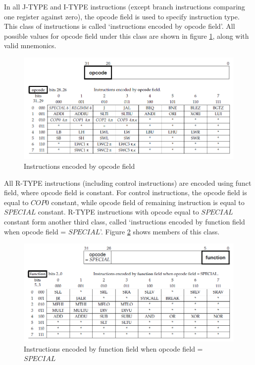 \documentclass[]{scrartcl}
\begin{document}
In all J-TYPE and I-TYPE instructions
(except branch instructions comparing one register against zero),
the opcode field is used to specify instruction type. This class
of instructions is called `instructions encoded by opcode field'.
All possible values for opcode field under this class are shown
in figure \ref{encoding1}, along with valid mnemonics.\\

\begin{figure}[H]
\begin{center}
\includegraphics[width=\textwidth]{encoding1.png}
\end{center}
\caption{Instructions encoded by opcode field}
\label{encoding1}
\end{figure}

All R-TYPE instructions (including control instructions)
are encoded using funct field, where opcode field is constant.
For control instructions, the opcode field is equal to $COP0$ constant,
while opcode field of remaining instruction is equal to $SPECIAL$ constant.
R-TYPE instructions with opcode equal to $SPECIAL$ constant form
another third class, called `instructions encoded by function field
when opcode field = $SPECIAL$'. Figure \ref{encoding2} shows
members of this class.\\

\begin{figure}[H]
\begin{center}
\includegraphics[width=\textwidth]{encoding2.png}
\end{center}
\caption{Instructions encoded by function field when opcode field = $SPECIAL$}
\label{encoding2}
\end{figure}
\end{document}
